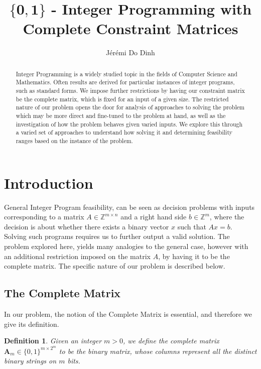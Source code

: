 \documentclass{article}
\title{$\mathbf{\{0,1\}}$ - Integer Programming with Complete Constraint Matrices}
\author{Jérémi Do Dinh}
\date{}
\newtheorem{definition}{Definition}
\begin{document}
\maketitle
\begin{abstract}
    Integer Programming is a widely studied topic in the fields of Computer Science  and Mathematics. Often results are derived for particular instances of integer programs, such as standard forms. We impose further restrictions by having our constraint matrix be the complete matrix, which is fixed for an input of a given size. The restricted nature of our problem opens the door for analysis of approaches to solving the problem which may be more direct and fine-tuned to the problem at hand, as well as the investigation of how the problem behaves given varied inputs. We explore this through a varied set of approaches to understand how solving it and determining feasibility ranges based on the instance of the problem.
\end{abstract}


\section{Introduction}
General Integer Program feasibility, can be seen as decision problems with inputs corresponding to a matrix $ A \in \mathbb{Z}^{m\times n} $ and a right hand side $ b \in \mathbb{Z}^m $, where the decision is about whether there exists a binary vector $ x $ such that $ Ax = b $. Solving such programs requires us to further output a valid solution. The problem explored here, yields many analogies to the general case, however with an additional restriction imposed on the matrix $ A $, by having it to be the complete matrix. The specific nature of our problem is described below.

\subsection{The Complete Matrix}
In our problem, the notion of the Complete Matrix is essential, and therefore we give its definition. 
\begin{adjustwidth}{10pt}{10pt}
	\begin{definition}
		Given an integer $m > 0$, we define the complete matrix $\mathbf{A}_m \in \{0, 1\}^{m \times 2^m}$ to be the binary matrix, whose columns represent all the distinct binary strings on $m$ bits. 
\end{definition}
\end{adjustwidth}
\end{document}
